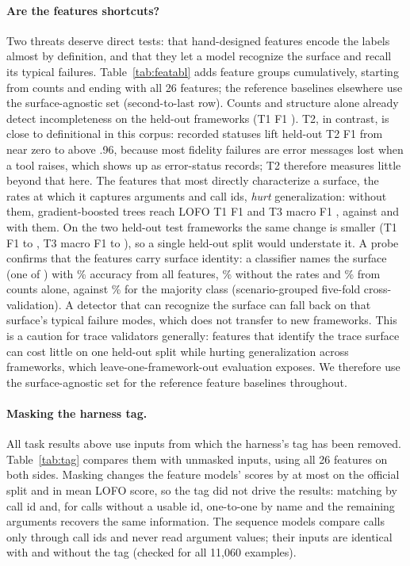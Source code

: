 \documentclass[10pt]{article}
\begin{document}
\paragraph{Are the features shortcuts?} Two threats deserve direct tests: that hand-designed features encode the labels almost by definition, and that they let a model recognize the surface and recall its typical failures. Table~\ref{tab:featabl} adds feature groups cumulatively, starting from counts and ending with all 26 features; the reference baselines elsewhere use the surface-agnostic set (second-to-last row). Counts and structure alone already detect incompleteness on the held-out frameworks (T1 F1 \faCountsTOne). T2, in contrast, is close to definitional in this corpus: recorded statuses lift held-out T2 F1 from near zero to above .96, because most fidelity failures are error messages lost when a tool raises, which shows up as error-status records; T2 therefore measures little beyond that here. The features that most directly characterize a surface, the rates at which it captures arguments and call ids, \emph{hurt} generalization: without them, gradient-boosted trees reach LOFO T1 F1 \faNoRatesTOneLofo{} and T3 macro F1 \faNoRatesTThreeLofo, against \faAllTOneLofo{} and \faAllTThreeLofo{} with them. On the two held-out test frameworks the same change is smaller (T1 F1 \faAllTOne{} to \faNoRatesTOne, T3 macro F1 \faAllTThree{} to \faNoRatesTThree), so a single held-out split would understate it. A probe confirms that the features carry surface identity: a classifier names the surface (one of \probeClasses) with \probeAll\% accuracy from all features, \probeNoRates\% without the rates and \probeCounts\% from counts alone, against \probeChance\% for the majority class (scenario-grouped five-fold cross-validation). A detector that can recognize the surface can fall back on that surface's typical failure modes, which does not transfer to new frameworks. This is a caution for trace validators generally: features that identify the trace surface can cost little on one held-out split while hurting generalization across frameworks, which leave-one-framework-out evaluation exposes. We therefore use the surface-agnostic set for the reference feature baselines throughout.

\paragraph{Masking the harness tag.} All task results above use inputs from which the harness's tag has been removed. Table~\ref{tab:tag} compares them with unmasked inputs, using all 26 features on both sides. Masking changes the feature models' scores by at most \tagMaxDiff{} on the official split and \tagMaxDiffLofo{} in mean LOFO score, so the tag did not drive the results: matching by call id and, for calls without a usable id, one-to-one by name and the remaining arguments recovers the same information. The sequence models compare calls only through call ids and never read argument values; their inputs are identical with and without the tag (checked for all 11{,}060 examples).
\end{document}
